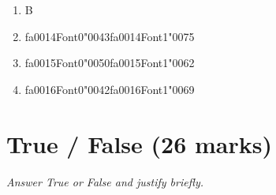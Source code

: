 \documentclass[12pt]{article}
\begin{document}
\begin{enumerate}[label=\arabic*.]
\begin{enumerate}[label=(\alph*)]
    \item B
    \item {\csname fa0014Font0\endcsname\char"0043}{\csname fa0014Font1\endcsname\char"0075}
    \item {\csname fa0015Font0\endcsname\char"0050}{\csname fa0015Font1\endcsname\char"0062}
    \item {\csname fa0016Font0\endcsname\char"0042}{\csname fa0016Font1\endcsname\char"0069}
\end{enumerate}
\end{enumerate}

\section*{True / False (26 marks)}
\textit{Answer True or False and justify briefly.}
\end{document}
